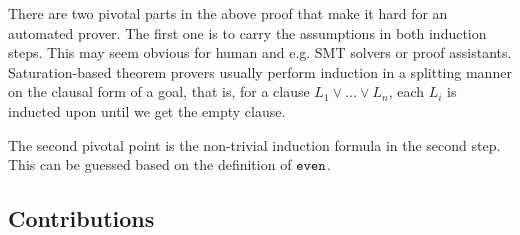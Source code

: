 There are two pivotal parts in the above proof that make it hard for an automated prover. The first one is to carry the assumptions in both induction steps. This may seem obvious for human and e.g. SMT solvers or proof assistants. Saturation-based theorem provers usually perform induction in a splitting manner on the clausal form of a goal, that is, for a clause $L_1\lor...\lor L_n$, each $L_i$ is inducted upon until we get the empty clause.

The second pivotal point is the non-trivial induction formula in the second step. This can be guessed based on the definition of $\mathtt{even}$.

\subsection{Contributions}

